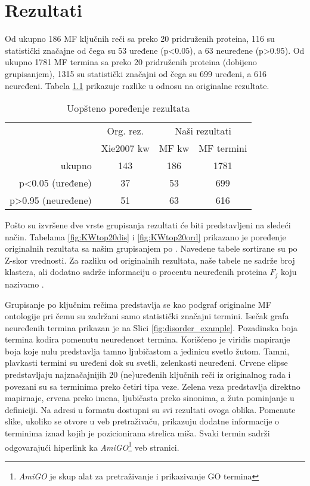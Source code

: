 
\chapter{Rezultati} %

\label{Rezultati} %

Od ukupno 186 MF ključnih reči sa preko 20 pridruženih proteina, 116 su
statistički značajne od čega su 53 uređene (p<0.05), a 63 neuređene (p>0.95).
Od ukupno 1781 MF termina sa preko 20 pridruženih proteina (dobijeno
grupisanjem), 1315 su statistički značajni od čega su 699 uređeni, a 616
neuređeni.  Tabela \ref{tab:kw_uopsteno} prikazuje razlike u odnosu na
originalne rezultate.

\begin{table}[htpb]
\begin{tabular}{|r|c|c|c|}
  \hline
             & Org. rez.  & \multicolumn{2}{c|}{ Naši rezultati} \\
             & Xie2007 kw & MF kw  & MF termini \\
  \hline                             
  ukupno     & 143        & 186      & 1781      \\
  p<0.05 (uređene)    & 37         & 53       & 699     \\ 
  p>0.95 (neuređene)    & 51         & 63       & 616     \\
  \hline
\end{tabular}
  \centering
  \caption{Uopšteno poređenje rezultata}
  \label{tab:kw_uopsteno}
\end{table}


Pošto su izvršene dve vrste grupisanja rezultati će biti predstavljeni na
sledeći način. Tabelama \ref{fig:KWtop20dis} i \ref{fig:KWtop20ord} prikazano
je poređenje originalnih rezultata sa našim grupisanjem po . Navedene tabele sortirane su po Z-skor vrednosti.  Za razliku od
originalnih rezultata, naše tabele ne sadrže broj klastera, ali dodatno sadrže 
informaciju o procentu neuređenih proteina $F_j$ koju nazivamo
. 

Grupisanje po ključnim rečima predstavlja se kao podgraf originalne MF
ontologije pri čemu su zadržani samo statistički značajni termini.  Isečak
grafa neuređenih termina prikazan je na Slici \ref{fig:disorder_example}.
Pozadinska boja termina kodira pomenutu neuređenost termina. Korišćeno je
viridis \cite{viridis} mapiranje boja koje nulu predstavlja tamno ljubičastom a
jedinicu svetlo žutom. Tamni, plavkasti termini su uređeni dok su svetli,
zelenkasti neuređeni. Crvene elipse predstavljaju najznačajnijih 20 (ne)uređenih ključnih
reči iz originalnog rada i povezani su sa terminima preko četiri tipa veze.
Zelena veza predstavlja direktno mapirnaje, crvena preko imena, ljubičasta
preko sinonima, a žuta pominjanje u definiciji.  Na adresi \cite{rezultati} u
 formatu dostupni su svi rezultati ovoga oblika. 
Pomenute slike, ukoliko se otvore u veb pretraživaču, prikazuju dodatne
informacije o terminima iznad kojih je pozicionirana strelica miša.  Svaki
termin sadrži odgovarajući hiperlink ka \textit{AmiGO}\footnote{\textit{AmiGO}
je skup alat za pretraživanje i prikazivanje GO termina } veb stranici.


